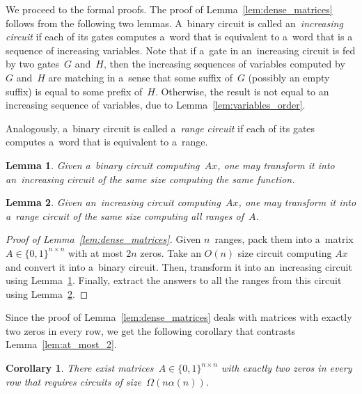 \documentclass[11pt,letterpaper]{article}
\newtheorem{lemma}{Lemma}
\newtheorem{corollary}{Corollary}
\begin{document}
We proceed to the formal proofs. The proof of Lemma~\ref{lem:dense_matrices} follows from the following two lemmas. A~binary circuit is called an~{\em increasing circuit} if each of its gates computes a~word that is equivalent to a~word that is a sequence of increasing variables.
Note that if a~gate in an~increasing circuit is fed by two gates~$G$ and~$H$, then the increasing sequences of variables computed by~$G$ and~$H$ are matching in a~sense that some suffix of~$G$ (possibly an empty suffix) is equal to some prefix of~$H$. Otherwise, the result is not equal to an increasing sequence of variables, due to Lemma~\ref{lem:variables_order}.

Analogously, a~binary circuit is called a~{\em range circuit} if each of its gates computes a~word that is equivalent to a~range.

\begin{lemma}\label{lemma:correctorder}
Given a~binary circuit computing~$Ax$, one may transform it into an~increasing circuit of the same size computing the same function.
\end{lemma}

\begin{lemma}\label{lemma:matrixranges}
Given an~increasing circuit computing~$Ax$, one may transform it into a~range circuit of the same size computing all ranges of~$A$.
\end{lemma}

\begin{proof}[Proof of Lemma~\ref{lem:dense_matrices}]
Given $n$~ranges, pack them into a~matrix $A \in \{0,1\}^{n \times n}$ with at most $2n$ zeros. Take an $O(n)$ size circuit computing $Ax$ and convert it into a~binary circuit. Then, transform it into an~increasing circuit using Lemma~\ref{lemma:correctorder}. Finally, extract the answers to all the ranges from this circuit using Lemma~\ref{lemma:matrixranges}.
\end{proof}

Since the proof of Lemma~\ref{lem:dense_matrices} deals with matrices with exactly two zeros in every row, we get the following corollary that contrasts Lemma~\ref{lem:at_most_2}.
\begin{corollary}\label{cor:noncommutativetwo}
There exist matrices~$A \in \{0,1\}^{n \times n}$ with exactly two zeros in every row that requires circuits of size~$\Omega(n\alpha(n))$.
\end{corollary}
\end{document}
